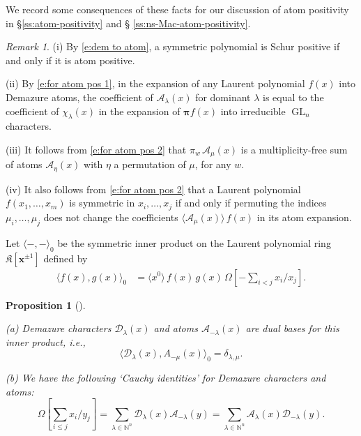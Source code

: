 \documentclass[12pt]{amsart}
\newtheorem{prop}[thm]{Proposition}
\theoremstyle{definition}
\theoremstyle{remark}
\newtheorem{remark}[thm]{Remark}
\newcommand{\NN}{{\mathbb N}}
\newcommand{\xx}{{\mathbf x}}
\newcommand{\pibold}{{\boldsymbol \pi }}
\newcommand{\Weyl}{\pibold }
\newcommand{\Dem}{\pi }
\newcommand{\Kfrak}{{\mathfrak K}}
\newcommand{\Acal}{{\mathcal A}}
\newcommand{\Dcal}{{\mathcal D}}
\DeclareMathOperator{\GL}{GL}
\begin{document}
We record some consequences of these facts for our discussion of atom
positivity in \S \ref{ss:atom-positivity} and \S
\ref{ss:ns-Mac-atom-positivity}.

\begin{remark}\label{rem:for atom pos} 
(i) By \eqref{e:dem to atom}, a symmetric
polynomial is Schur positive if and only if it is atom positive.

(ii) By \eqref{e:for atom pos 1}, in the expansion of any Laurent
polynomial $f(x)$ into Demazure atoms, the coefficient of
$\Acal_{\lambda }(x)$ for dominant $\lambda $ is equal to the
coefficient of $\chi _{\lambda }(x)$ in the expansion of $\Weyl f(x)$
into irreducible $\GL _{n}$ characters.

(iii) It follows from \eqref{e:for atom pos 2} that $\Dem _{w}\, \Acal
_{\mu }(x)$ is a multiplicity-free sum of atoms $\Acal _{\eta }(x)$
with $\eta $ a permutation of $\mu $, for any $w$.

(iv) It also follows from \eqref{e:for atom pos 2} that a Laurent
polynomial $f(x_{1},\ldots,x_{m})$ is symmetric in
$x_{i},\ldots,x_{j}$ if and only if permuting the indices $\mu
_{i},\ldots,\mu _{j}$ does not change the coefficients $\langle \Acal
_{\mu }(x) \rangle\, f(x)$ in its atom expansion.
\end{remark}

Let $\langle -,- \rangle_{0}$ be the symmetric inner product
on the Laurent polynomial ring $\Kfrak [\xx ^{\pm 1}]$ defined by
\begin{align}\label{e:atom-demazure-inner}
\langle f(x),g(x) \rangle _{0} & = \langle x^{0} \rangle \, f(x)\,
g(x)\, \Omega [-\sum _{i<j} x_{i}/x_{j}].
\end{align}

\begin{prop}[{\cite{FuLascoux09, LascouxCrystal}}]\label{prop:Dem-At-orthog}

(a) Demazure characters $\Dcal _{\lambda }(x)$ and atoms $\Acal
_{-\lambda }(x)$ are dual bases for this inner product, i.e.,
\begin{equation}\label{e:atom-demazure-dual}
\langle \Dcal _{\lambda }(x), A_{-\mu }(x) \rangle_{0} = \delta
_{\lambda ,\mu }.
\end{equation}

(b) We have the following `Cauchy identities' for Demazure characters
and atoms:
\begin{equation}\label{e:atom-demazure-Cauchy}
\Omega [\sum _{i\leq j} x_{i}/y_{j}] = \sum _{\lambda \in \NN ^{n}}
\Dcal _{\lambda }(x)\mathcal A_{-\lambda }(y) = \sum _{\lambda \in \NN
^{n}} \Acal _{\lambda }(x)\mathcal \Dcal_{-\lambda }(y).
\end{equation}
\end{prop}
\end{document}
